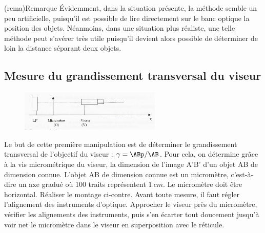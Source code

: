 \documentclass[../main/main.tex]{subfiles}
\begin{document}
{	\begin{tcb}[width=\linewidth](rema){Remarque} Évidemment, dans la situation
		présente, la méthode semble un peu artificielle, puisqu'il est possible de
		lire directement sur le banc optique la position des objets. Néanmoins, dans
		une situation plus réaliste, une telle méthode peut s'avérer très utile
		puisqu'il devient alors possible de déterminer de loin la distance séparant
		deux objets.
	\end{tcb}

	\subsection{Mesure du grandissement transversal du viseur}

	\begin{figure}
		\begin{center}
			\includegraphics[width=0.6\textwidth]{PointeTransversal}
		\end{center}
	\end{figure}

	Le but de cette première manipulation est de déterminer le grandissement
	transversal de l'objectif du viseur : $\gamma = \ABp/\AB$. Pour
	cela, on détermine grâce à la vis micrométrique du viseur, la dimension de
	l'image A'B' d'un objet AB de dimension connue. L'objet AB de dimension
	connue est un micromètre, c'est-à-dire un axe gradué où 100 traits
	représentent $\SI{1}{cm}$. Le micromètre doit être horizontal. Réaliser le
	montage ci-contre. Avant toute mesure, il faut régler l'alignement des
	instruments d'optique.
	\bigbreak
	Approcher le viseur près du micromètre, vérifier les alignements des
	instruments, puis s'en écarter tout doucement jusqu'à voir net le micromètre
	dans le viseur en superposition avec le réticule.

}
\end{document}
